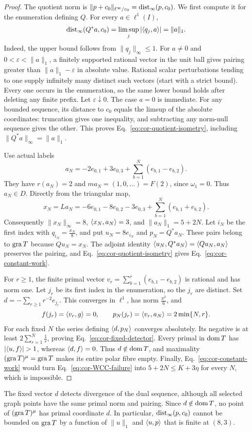 \begin{proof}
The quotient norm is $\|p+c_0\|_{\ell^\infty/c_0}=\operatorname{dist}_\infty(p,c_0)$.
We first compute it for the enumeration defining $Q$.
For every $a\in\ell^1(I)$,
\begin{equation}
\operatorname{dist}_{\infty}(Q^*a,c_0)
=\limsup_j|\langle q_j,a\rangle|=\|a\|_1.
\label{eq:cor-quotient-isometry}
\end{equation}
Indeed, the upper bound follows from $\|q_j\|_\infty\le1$. For
$a\ne0$ and $0<\varepsilon<\|a\|_1$, a finitely supported rational
vector in the unit ball gives pairing greater than
$\|a\|_1-\varepsilon$ in absolute value. Rational scalar perturbations
tending to one supply infinitely many distinct such vectors (start
with a strict bound). Every one occurs in the enumeration, so the
same lower bound holds after deleting any finite prefix. Let
$\varepsilon\downarrow0$. The case $a=0$ is immediate. For any bounded
sequence, its distance to $c_0$ equals the limsup of the absolute
coordinates: truncation gives one inequality, and subtracting any
norm-null sequence gives the other. This proves
Eq.~\eqref{eq:cor-quotient-isometry}, including
$\|Q^*a\|_\infty=\|a\|_1$.

Use actual labels
\[
a_N=-2e_{0,1}+3e_{0,3}
       +\sum_{b=1}^N(e_{b,1}-e_{b,2}).
\]
They have $r(a_N)=2$ and $ma_N=(1,0,\ldots)=F(2)$, since
$\omega_1=0$. Thus $a_N\in D$. Directly from the triangular map,
\[
x_N=La_N=-6e_{0,1}-8e_{0,2}-3e_{0,3}
                  +\sum_{b=1}^N(e_{b,1}+e_{b,2}).
\]
Consequently $\|x_N\|_\infty=8$, $\langle x_N,a_N\rangle=3$, and
$\|a_N\|_1=5+2N$. Let $i_N$ be the first index with
$q_{i_N}=\frac{x_N}{8}$, and put $u_N=8e_{i_N}$ and $p_N=Q^*a_N$.
These pairs belong to $\operatorname{gra} T$ because $Qu_N=x_N$. The adjoint identity
$\langle u_N,Q^*a_N\rangle=\langle Qu_N,a_N\rangle$ preserves the pairing,
and Eq.~\eqref{eq:cor-quotient-isometry} gives
Eq.~\eqref{eq:cor-constant-work}.

For $r\ge1$, the finite primal vector
$v_r=\sum_{b=1}^r(e_{b,1}-e_{b,2})$ is rational and has norm one.
Let $j_r$ be its first index in the enumeration, so the $j_r$ are
distinct. Set $d=-\sum_{r\ge1}r^{-2}e_{j_r}$. This converges in
$\ell^1$, has norm $\frac{\pi^2}{6}$, and
\[
f(j_r)=\langle v_r,g\rangle=0,\qquad
p_N(j_r)=\langle v_r,a_N\rangle=2\min\{N,r\}.
\]
For each fixed $N$ the series defining $\langle d,p_N\rangle$ converges
absolutely. Its negative is at least
$2\sum_{r=1}^N\frac{1}{r}$, proving Eq.~\eqref{eq:cor-fixed-detector}.
Every primal in $\operatorname{dom} T$ has $|\pair{u}{f}|>1$, whereas
$\langle d,f\rangle=0$. Thus $d\notin\operatorname{dom} T$, and maximality
$(\operatorname{gra} T)^\mu=\operatorname{gra} T$ makes its entire polar fibre empty.
Finally, Eq.~\eqref{eq:cor-constant-work} would turn
Eq.~\eqref{eq:cor-WCC-failure} into $5+2N\le K+3\eta$ for every
$N$, which is impossible.
\end{proof}
The fixed vector $d$ detects divergence of the dual sequence, although
all selected graph points have the same primal norm and pairing.
Since $d\notin\operatorname{dom} T$, no point of $(\operatorname{gra} T)^\mu$ has primal coordinate
$d$. In particular, $\operatorname{dist}_\infty(p,c_0)$ cannot be bounded on $\operatorname{gra} T$
by a function of $\|u\|_1$ and $\langle u,p\rangle$ that is finite at $(8,3)$.

